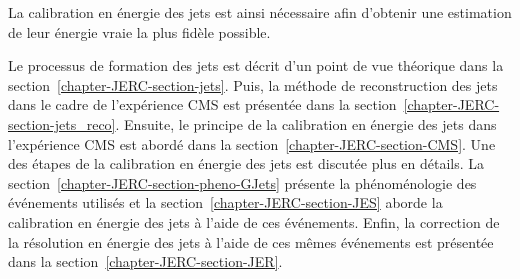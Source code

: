 La calibration en énergie des jets est ainsi nécessaire afin d'obtenir une estimation de leur énergie \og vraie \fg{} la plus fidèle possible.
\par Le processus de formation des jets est décrit d'un point de vue théorique dans la section~\ref{chapter-JERC-section-jets}.
Puis, la méthode de reconstruction des jets dans le cadre de l'expérience CMS est présentée dans la section~\ref{chapter-JERC-section-jets_reco}.
Ensuite, le principe de la calibration en énergie des jets dans l'expérience CMS est abordé dans la section~\ref{chapter-JERC-section-CMS}.
Une des étapes de la calibration en énergie des jets est discutée plus en détails.
La section~\ref{chapter-JERC-section-pheno-GJets} présente la phénoménologie des événements utilisés et la section~\ref{chapter-JERC-section-JES} aborde la calibration en énergie des jets à l'aide de ces événements.
Enfin, la correction de la résolution en énergie des jets à l'aide de ces mêmes événements est présentée dans la section~\ref{chapter-JERC-section-JER}.